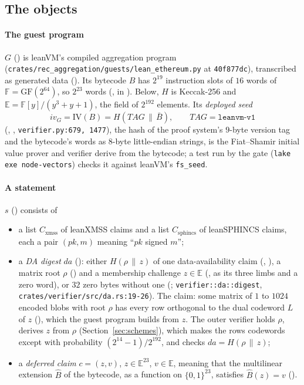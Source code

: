 \documentclass[11pt]{article}
\newcommand{\Cx}{C_{\mathrm{xmss}}}
\newcommand{\Cs}{C_{\mathrm{sphincs}}}
\begin{document}
\subsection{The objects}

\paragraph{The guest program} $G$ () is leanVM's compiled aggregation
program (\texttt{crates/rec\_aggregation/guests/lean\_ethereum.py} at \texttt{40f877dc}),
transcribed as generated data (). Its bytecode $B$ has $2^{19}$ instruction
slots of $16$ words of $\mathbb{F} = \mathrm{GF}(2^{64})$, so $2^{23}$ words
(, in ). Below, $H$ is Keccak-256 and
$\mathbb{E} = \mathbb{F}[y]/(y^3+y+1)$, the field of $2^{192}$ elements. Its \emph{deployed seed}
\[
iv_G = \mathrm{IV}(B) = H(\mathit{TAG} \,\|\, \bar B), \qquad \mathit{TAG} = \texttt{leanvm-v1}
\]
(, , \texttt{verifier.py:679, 1477}), the hash of the
proof system's $9$-byte version tag and the bytecode's words as $8$-byte little-endian strings, is
the Fiat--Shamir initial value prover and verifier derive from the bytecode; a test run by the gate
(\texttt{lake exe node-vectors}) checks it against leanVM's \texttt{fs\_seed}.

\paragraph{A statement} $s$ () consists of
\begin{itemize}
\item a list $\Cx$ of leanXMSS claims and a list $\Cs$ of leanSPHINCS claims, each a pair $(pk, m)$
meaning ``$pk$ signed $m$'';
\item a \emph{DA digest} $\mathit{da}$ (): either $H(\rho \,\|\, z)$ of one
data-availability claim (, ), a matrix root $\rho$
() and a membership challenge $z \in \mathbb{E}$ (, as its
three limbs and a zero word), or $32$ zero bytes without one (;
\texttt{verifier::da::digest}, \texttt{crates/verifier/src/da.rs:19-26}). The claim: some matrix of
$1$ to $1024$ encoded blobs with root $\rho$ has every row orthogonal to the dual codeword $L$ of $z$
(), which the guest program builds from $z$. The outer verifier holds
$\rho$, derives $z$ from $\rho$ (Section~\ref{sec:schemes}), which makes the rows codewords except
with probability $(2^{14}-1)/2^{192}$, and checks $\mathit{da} = H(\rho \,\|\, z)$;
\item a \emph{deferred claim} $c = (z, v)$, $z \in \mathbb{E}^{23}$, $v \in \mathbb{E}$, meaning
that the multilinear extension $\widehat{B}$ of the bytecode, as a function on $\{0,1\}^{23}$,
satisfies $\widehat{B}(z) = v$ ().
\end{itemize}
\end{document}
